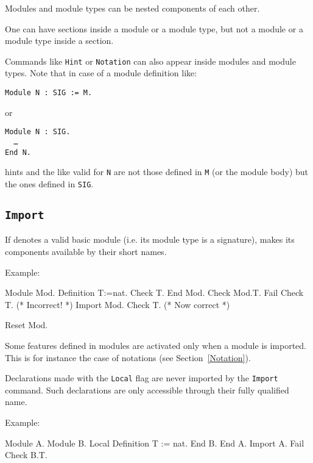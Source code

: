 \begin{Remarks}
\item Modules and module types can be nested components of each other.
\item One can have sections inside a module or a module type, but
  not a module or a module type inside a section.
\item Commands like \texttt{Hint} or \texttt{Notation} can
  also appear inside modules and module types. Note that in case of a
  module definition like:

    \smallskip
    \noindent
    {\tt Module N : SIG := M.}
    \smallskip

    or

    \smallskip
    {\tt Module N : SIG.\\
      \ \ \dots\\
      End N.}
    \smallskip

    hints and the like valid for \texttt{N} are not those defined in
    \texttt{M} (or the module body) but the ones defined in
    \texttt{SIG}.

\end{Remarks}

\subsection{\tt Import {\qualid}
\label{Import}}

If {\qualid} denotes a valid basic module (i.e. its module type is a
signature), makes its components available by their short names.

Example:

\begin{coq_example}
Module Mod.
  Definition T:=nat.
  Check T.
End Mod.
Check Mod.T.
Fail Check T. (* Incorrect! *)
Import Mod.
Check T. (* Now correct *)
\end{coq_example}
\begin{coq_eval}
Reset Mod.
\end{coq_eval}

Some features defined in modules are activated only when a module is
imported. This is for instance the case of notations (see
Section~\ref{Notation}).

Declarations made with the {\tt Local} flag are never imported by the
{\tt Import} command. Such declarations are only accessible through their
fully qualified name.

Example:

\begin{coq_example}
Module A.
Module B.
Local Definition T := nat.
End B.
End A.
Import A.
Fail Check B.T.
\end{coq_example}

